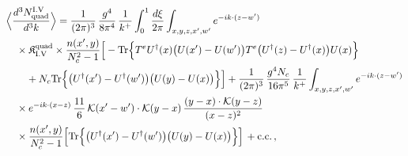 \begingroup\small
\begin{align}\label{eq:S-I.V-2o}
&\Big\langle\frac{d^{3}N^{\rm I.V}_{{\rm quad}}}{d^{3}k}\Big\rangle=\frac{1}{(2\pi)^{3}}\, \frac{g^{4}}{8\pi^{4}}\, \frac{1}{k^{+}} \int_{0}^{1}\frac{d\xi}{2\pi} \int_{x,y,z,x',w'}e^{-ik\cdot(z-w')}\notag\\
&\quad \times \mathfrak{K}^{\rm quad}_{\rm I.V} \times\frac{n(x',y)}{N_{c}^{2}-1}\Big[ -{\rm Tr}\Big\{T^{e}U^{\dagger}(x)\big(U(x')-U(w')\big)T^{e}\big(U^{\dagger}(z)-U^{\dagger}(x)\big)U(x)\Big\}\notag\\
&\quad\quad +N_{c}{\rm Tr}\Big\{\big(U^{\dagger}(x')-U^{\dagger}(w')\big)\big(U(y)-U(x)\big)\Big\}\Big] +\frac{1}{(2\pi)^{3}}\, \frac{g^{4}N_{c}}{16\pi^{5}}\, \frac{1}{k^{+}} \int_{x,y,z,x',w'}e^{-ik\cdot(z-w')}\notag\\
&\quad \times e^{-ik\cdot(x-z)}\, \frac{11}{6}\, \mathcal{K}(x'-w')\cdot\mathcal{K}(y-x)\, \frac{(y-x)\cdot\mathcal{K}(y-z)}{(x-z)^{2}}\notag\\
&\quad \times\frac{n(x',y)}{N_{c}^{2}-1}\Big[ {\rm Tr}\Big\{\big(U^{\dagger}(x')-U^{\dagger}(w')\big)\big(U(y)-U(x)\big)\Big\}\Big]\, +{\rm c.c.}\, ,
\end{align}
\endgroup
